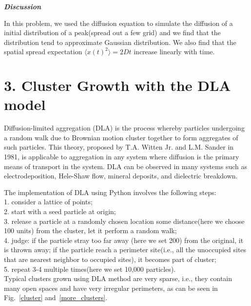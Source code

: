 \documentclass[aps,prl,preprint,superscriptaddress]{revtex4}
\begin{document}
\begin{enumerate}
\textbf{\textit{Discussion}}

In this problem, we used the diffusion equation to simulate the diffusion of a initial distribution of a peak(spread out a few grid) and we find that the distribution tend to approximate Gaussian distribution. We also find that the spatial spread expectation $\langle x(t)^2\rangle=2Dt$ increase linearly with time.
\end{enumerate}

	\section{3. Cluster Growth with the DLA model}

Diffusion-limited aggregation (DLA) is the process whereby particles undergoing a random walk due to Brownian motion cluster together to form aggregates of such particles. This theory, proposed by T.A. Witten Jr. and L.M. Sander in 1981, is applicable to aggregation in any system where diffusion is the primary means of transport in the system. DLA can be observed in many systems such as electrodeposition, Hele-Shaw flow, mineral deposits, and dielectric breakdown.

The implementation of DLA using Python involves the following steps:\\
1. consider a lattice of points;\\
2. start with a seed particle at origin;\\
3. release a particle at a randomly chosen location some distance(here we choose 100 units) from the cluster, let it perform a random walk;\\
4. judge: if the particle stray too far away (here we set 200) from the original, it is thrown away; if the particle reach a perimeter site(i.e., all the unoccupied sites that are nearest neighbor to occupied sites), it becomes part of cluster;\\
5. repeat 3-4 multiple times(here we set 10,000 particles).\\

Typical clusters grown using DLA method are very sparse, i.e., they contain many open spaces and have very irregular perimeters, as can be seen in Fig.~\ref{cluster} and~\ref{more_clusters}. 
\end{document}
